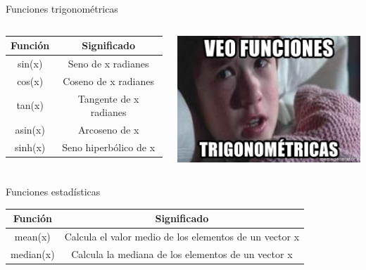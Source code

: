 \documentclass{bredelebeamer}
\begin{document}
\begin{frame}{Funciones trigonométricas}
\begin{columns}
\begin{column}{0.5\textwidth}
\begin{center}
\begin{table}[]
\centering
\begin{tabular}{|c|c|}
\hline
Función & Significado           \\ \hline
sin(x)  & Seno de x radianes 	\\ \hline
cos(x)  & Coseno de x radianes  \\ \hline
tan(x)  & Tangente de x radianes\\ \hline
asin(x) & Arcoseno de x         \\ \hline
sinh(x) & Seno hiperbólico de x \\ \hline
\end{tabular}
\end{table}
\end{center}
\end{column}
\begin{column}{0.5\textwidth}
\begin{center}
\includegraphics[scale=0.5]{images/fig43.png}
\end{center}
\end{column}
\end{columns}
\end{frame}

\begin{frame}{Funciones estadísticas}
\begin{table}[]
\centering
\begin{tabular}{|c|c|}
\hline
Función   & Significado                                            \\ \hline
mean(x)   & Calcula el valor medio de los elementos de un vector x \\ \hline
median(x) & Calcula la mediana de los elementos de un vector x     \\ \hline
\end{tabular}
\end{table}
\end{frame}
\end{document}
